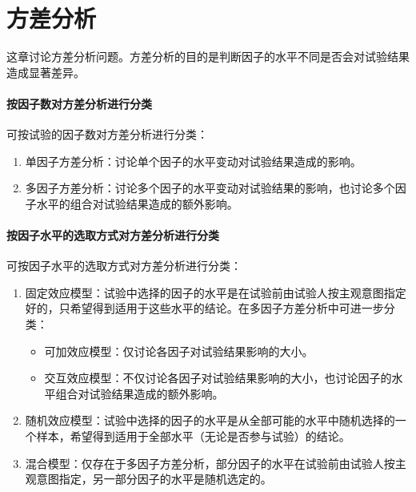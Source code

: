 \chapter{方差分析}

这章讨论方差分析问题。方差分析的目的是判断因子的水平不同是否会对试验结果造成显著差异。
\subsubsection{按因子数对方差分析进行分类}
可按试验的因子数对方差分析进行分类：
\begin{enumerate}
	\item 单因子方差分析：讨论单个因子的水平变动对试验结果造成的影响。
	\item 多因子方差分析：讨论多个因子的水平变动对试验结果的影响，也讨论多个因子水平的组合对试验结果造成的额外影响。
\end{enumerate}
\subsubsection{按因子水平的选取方式对方差分析进行分类}
可按因子水平的选取方式对方差分析进行分类：
\begin{enumerate}
	\item 固定效应模型：试验中选择的因子的水平是在试验前由试验人按主观意图指定好的，只希望得到适用于这些水平的结论。在多因子方差分析中可进一步分类：
	\begin{itemize}
		\item 可加效应模型：仅讨论各因子对试验结果影响的大小。
		\item 交互效应模型：不仅讨论各因子对试验结果影响的大小，也讨论因子的水平组合对试验结果造成的额外影响。
	\end{itemize}
	\item 随机效应模型：试验中选择的因子的水平是从全部可能的水平中随机选择的一个样本，希望得到适用于全部水平（无论是否参与试验）的结论。
	\item 混合模型：仅存在于多因子方差分析，部分因子的水平在试验前由试验人按主观意图指定，另一部分因子的水平是随机选定的。
\end{enumerate}









